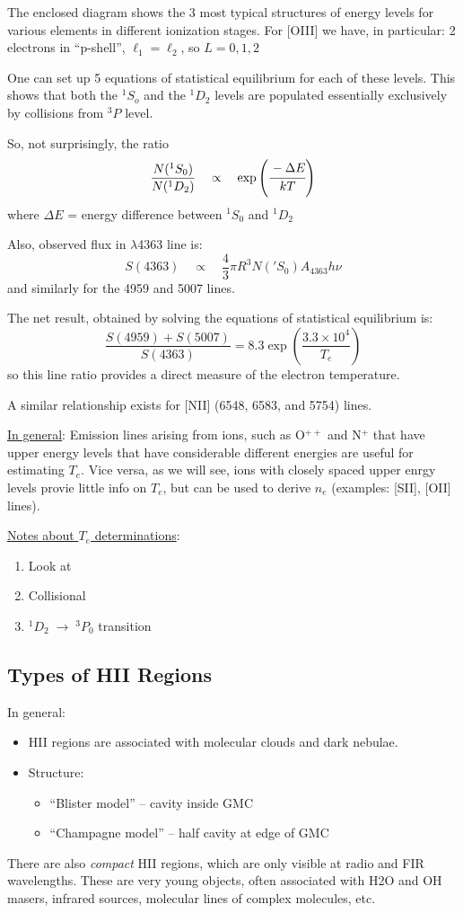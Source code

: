 \documentclass[11pt]{article}
\newcommand{\mar}[1]{\hspace{0pt}\marginpar{-\textcolor{black}{#1}-}}
\begin{document}
The enclosed diagram shows the 3 most typical structures of energy
levels for various elements in different ionization stages.
For [OIII] we have, in particular: 2 electrons in ``p-shell'',
$\ell_{1} = \ell_{2}$, so $L = 0, 1, 2$

\mar{81}One can set up 5 equations of statistical equilibrium for each
of these levels. This shows that both the $^{1}S_{o}$ and the
$^{1}D_{2}$ levels are populated essentially exclusively by collisions
from $^{3}P$ level.

So, not surprisingly, the ratio
$${
\frac{N(^{1}S_{0})}{N(^{1}D_{2})}\quad\propto\quad
\exp\left(\cfrac{-\Delta{E}}{kT}\right)
}$$
where $\Delta{E}$ = energy difference between
$^{1}S_{0}$ and $^{1}D_{2}$

Also, observed flux in $\lambda$4363 line is:
$${
    S(4363) \quad\propto\quad \frac{4}{3}\pi{R^{3}}N('S_{0})A_{4363}h\nu
}$$
and similarly for the 4959 and 5007 lines.

The net result, obtained by solving the equations of statistical
equilibrium is:
$${
    \frac{S(4959)+S(5007)}{S(4363)} =
    8.3\exp\left(\frac{3.3\times10^{4}}{T_{e}}\right)
}$$
so this line ratio provides a direct measure of the electron
temperature.

A similar relationship exists for
[NII] (6548, 6583, and 5754) lines.

\underline{In general}: Emission lines arising from ions, such as
O$^{++}$ and N$^{+}$ that have upper energy levels that have considerable
different energies are useful for estimating $T_{e}$. Vice versa,
as we will see, ions with closely spaced upper enrgy levels provie
little info on $T_{e}$, but can be used to derive $n_{e}$
(examples: [SII], [OII] lines).

\underline{Notes about $T_{e}$ determinations}:
\begin{enumerate}
    \item Look at
    \item Collisional
    \item $^{1}D_{2} \;\rightarrow\; ^{3}P_{0} $ transition
\end{enumerate}

\subsection{Types of HII Regions}
\mar{85}In general:
\begin{itemize}
    \item HII regions are associated with molecular clouds and dark
        nebulae.
    \item Structure:
        \begin{itemize}
            \item ``Blister model'' -- cavity inside GMC
            \item ``Champagne model'' -- half cavity at edge of GMC
        \end{itemize}
\end{itemize}
There are also \emph{compact} HII regions, which are only visible at
radio and FIR wavelengths. These are very young objects, often associated
with H2O and OH masers, infrared sources, molecular lines of complex
molecules, etc.
\end{document}
